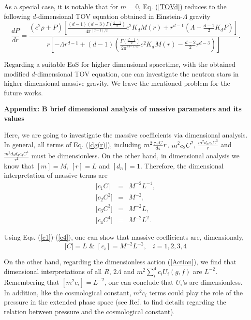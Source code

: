 \documentclass[aps]{revtex4}
\begin{document}
As a special case, it is notable that for $m=0$, Eq. (\ref{TOVd}) reduces to
the following $d$-dimensional TOV equation obtained in Einstein-$\Lambda $
gravity \cite{TOV-Lambda}%
\begin{equation}
\frac{dP}{dr}=\frac{\left( c^{2}\rho +P\right) \left[ \frac{(d-1)(d-3)\Gamma
(\frac{d-1}{2})}{4\pi ^{\left( d-1\right) /2}}c^{2}K_{d}M(r)+r^{d-1}\left(
\Lambda +\frac{d-1}{2}K_{d}P\right) \right] }{r\left[ -\Lambda
r^{d-1}+(d-1)\left( \frac{\Gamma (\frac{d-1}{2})}{2\pi ^{^{\left( d-1\right)
/2}}}c^{2}K_{d}M(r)-\frac{d-2}{2}r^{d-3}\right) \right] }.  \label{TOVLambda}
\end{equation}

Regarding a suitable EoS for higher dimensional spacetime, with
the obtained modified $d$-dimensional TOV equation, one can
investigate the neutron stars in higher dimensional massive
gravity. We leave the mentioned problem for the future works.

\begin{center}
\textbf{Appendix: B brief dimensional analysis of massive parameters and its
values}
\end{center}

Here, we are going to investigate the massive coefficients via dimensional
analysis. In general, all terms of Eq. (\ref{dg(r)}), including $m^{2}\frac{%
c_{1}C}{d_{2}}r$, $m^{2}c_{2}C^{2}$, $\frac{m^{2}d_{3}c_{3}C^{3}}{r}$ and $%
\frac{m^{2}d_{3}d_{4}c_{4}C^{4}}{r^{2}}$ must be dimensionless. On the other
hand, in dimensional analysis we know that $[m]=M$, $[r]=L$ and $[d_{n}]=1$.
Therefore, the dimensional interpretation of massive terms are%
\begin{eqnarray}
\lbrack c_{1}C] &=&M^{-2}L^{-1},  \label{c1} \\
\lbrack c_{2}C^{2}] &=&M^{-2},  \label{c2} \\
\lbrack c_{3}C^{3}] &=&M^{-2}L,  \label{c3} \\
\lbrack c_{4}C^{4}] &=&M^{-2}L^{2}.  \label{c4}
\end{eqnarray}

Using Eqs. (\ref{c1})-(\ref{c4}), one can show that massive coefficients
are, dimensionaly,%
\begin{equation*}
\lbrack C]=L\text{ \ \ \ \ \ \ \&\ \ \ \ \ \ \ \ }[c_{i}]=M^{-2}L^{-2},\ \ \
\ i=1,2,3,4
\end{equation*}

On the other hand, regarding the dimensionless action (\ref{Action}), we
find that dimensional interpretations of all $R$, $2\Lambda $ and $%
m^{2}\sum_{i}^{4}c_{i}U_{i}(g,f)$ are $L^{-2}$. Remembering that $%
[m^{2}c_{i}]=L^{-2}$, one can conclude that $U_{i}$'s are dimensionless. In
addition, like the cosmological constant, $m^{2}c_{i}$ terms could play the
role of the pressure in the extended phase space (see Ref. \cite{Kubiznak}
to find details regarding the relation between pressure and the cosmological
constant).
\end{document}
